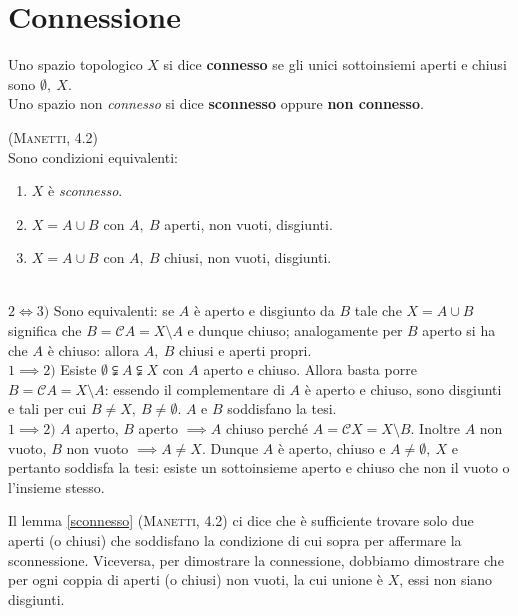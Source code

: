 \section{Connessione}
\begin{define}
Uno spazio topologico $X$ si dice \textbf{connesso} se gli unici sottoinsiemi aperti e chiusi sono $\emptyset,\ X$.\\
Uno spazio non \textit{connesso} si dice \textbf{sconnesso} oppure \textbf{non connesso}.
\end{define}
\begin{lemming}\label{sconnesso}\textsc{(Manetti, 4.2)}\\
	Sono condizioni equivalenti:
	\begin{enumerate}
		\item $X$ è \textit{sconnesso}.
		\item $X=A\cup B$ con $A,\ B$ aperti, non vuoti, disgiunti.
		\item $X=A\cup B$ con $A,\ B$ chiusi, non vuoti, disgiunti.
	\end{enumerate}
\vspace{-3mm}
\end{lemming}
\begin{demonstration}~{}\\
$2\iff3)$ Sono equivalenti: se $A$ è aperto e disgiunto da $B$ tale che $X=A\cup B$ significa che $B=\mathcal{C}A=X\setminus A$ e dunque chiuso; analogamente per $B$ aperto si ha che $A$ è chiuso: allora $A,\ B$ chiusi e aperti propri.\\
$1\implies2)$ Esiste $\emptyset\subsetneqq A \subsetneqq X$ con $A$ aperto e chiuso. Allora basta porre $B=\mathcal{C}A=X\setminus A$: essendo il complementare di $A$ è aperto e chiuso, sono disgiunti e tali per cui $B\neq X,\ B\neq \emptyset$. $A$ e $B$ soddisfano la tesi.\\
$1\implies2)$ $A$ aperto, $B$ aperto $\implies A$ chiuso perché $A=\mathcal{C}X=X\setminus B$. Inoltre $A$ non vuoto, $B$ non vuoto $\implies A\neq X$. Dunque $A$ è aperto, chiuso e $A\neq \emptyset,\ X$ e pertanto soddisfa la tesi: esiste un sottoinsieme aperto e chiuso che non il vuoto o l'insieme stesso.
\end{demonstration}
\begin{observe}
	Il lemma \ref{sconnesso} \textsc{(Manetti, 4.2)} ci dice che è sufficiente trovare solo due aperti (o chiusi) che soddisfano la condizione di cui sopra per affermare la sconnessione. Viceversa, per dimostrare la connessione, dobbiamo dimostrare che per ogni coppia di aperti (o chiusi) non vuoti, la cui unione è $X$, essi non siano disgiunti.
\end{observe}
